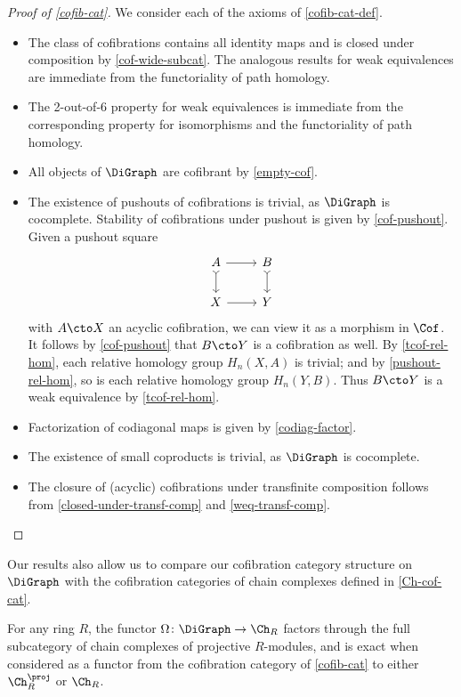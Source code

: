 \begin{proof}[Proof of \cref{cofib-cat}]
We consider each of the axioms of \cref{cofib-cat-def}.
\begin{itemize}
    \item[(C1)] The class of cofibrations contains all identity maps and is closed under composition by \cref{cof-wide-subcat}. 
    The analogous results for weak equivalences are immediate from the functoriality of path homology.
    \item[(C2)] The 2-out-of-6 property for weak equivalences is immediate from the corresponding property for isomorphisms and the functoriality of path homology.
    \item[(C3)] All objects of $\DiGraph$ are cofibrant by \cref{empty-cof}.
    \item[(C4)] The existence of pushouts of cofibrations is trivial, as $\DiGraph$ is cocomplete. 
    Stability of cofibrations under pushout is given by \cref{cof-pushout}.
    Given a pushout square 
    \[
      \begin{tikzcd}
        A \arrow[r] \arrow[d,tail] & B \arrow[d,tail] \\
        X \arrow[r] & Y
      \end{tikzcd}
    \]
    with $A \cto X$ an acyclic cofibration, we can view it as a morphism in $\Cof$.
    It follows by \cref{cof-pushout} that $B \cto Y$ is a cofibration as well.
    By \cref{tcof-rel-hom}, each relative homology group $H_n(X,A)$ is trivial; and by \cref{pushout-rel-hom}, so is each relative homology group $H_n(Y,B)$.
    Thus $B \cto Y$ is a weak equivalence by \cref{tcof-rel-hom}.
    \item[(C5)] Factorization of codiagonal maps is given by \cref{codiag-factor}.
    \item[(C6)] The existence of small coproducts is trivial, as $\DiGraph$ is cocomplete.
    \item[(C7)] The closure of (acyclic) cofibrations under transfinite composition follows from \cref{closed-under-transf-comp} and \cref{weq-transf-comp}. \qedhere
\end{itemize}
\end{proof}

Our results also allow us to compare our cofibration category structure on $\DiGraph$ with the cofibration categories of chain complexes defined in \cref{Ch-cof-cat}.

\begin{theorem}\label{Omega-exact}
For any ring $R$, the functor $\Omega \colon \DiGraph \to \Ch_R$ factors through the full subcategory of chain complexes of projective $R$-modules, and is exact when considered as a functor from the cofibration category of \cref{cofib-cat} to either $\Ch^{\proj}_R$ or $\Ch_R$.
\end{theorem}

